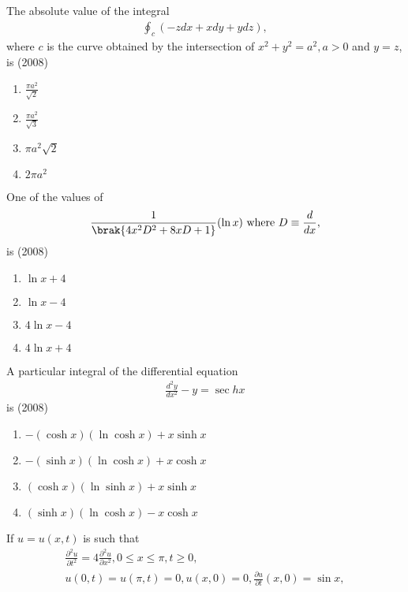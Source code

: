 	\item The absolute value of the integral
           \begin{align*}
		\oint_{c}(-zdx+xdy+ydz),
             \end{align*}
             where $c$ is the curve obtained by the intersection of $x^{2}+y^{2}=a^{2}, a>0$ and $y=z$, is
             \hfill{(2008)}
		\begin{enumerate}
			\item $\frac{\pi a^{2}}{\sqrt{2}}$
			\item $\frac{\pi a^{2}}{\sqrt{3}}$
			\item $\pi a^{2} \sqrt{2}$
			\item $2 \pi a^{2}$
        	\end{enumerate}	
	\item One of the values of
           \begin{align*}
		\frac{1}{\brak{4 x^{2} D^{2}+8 x D+1}}(\ln x) \text { where } D \equiv \frac{d}{d x},
             \end{align*} 
             is
             \hfill{(2008)}
		\begin{enumerate}
			\item $\ln x+4$
			\item $\ln x-4$
			\item $4 \ln x-4$
			\item $4 \ln x+4$
        	\end{enumerate}	
	\item A particular integral of the differential equation
             \begin{align*}
		\frac{d^{2} y}{d x^{2}}-y=\sec h x
             \end{align*}
	 is
	 \hfill{(2008)}
		\begin{enumerate}
			\item $-(\cosh x)(\ln \cosh x)+x \sinh x$
			\item $-(\sinh x)(\ln \cosh x)+x \cosh x$
			\item $(\cosh x)(\ln \sinh x)+x \sinh x$
			\item $(\sinh x)(\ln \cosh x)-x \cosh x$
        	\end{enumerate}
	\item If $u=u(x, t)$ is such that
                \begin{align*}
\frac{\partial^{2} u}{\partial t^{2}}=4 \frac{\partial^{2} u}{\partial x^{2}},
0 \leq x \leq \pi, t \geq 0,\\
u(0, t)=u(\pi, t)=0,
u(x, 0)=0,
\frac{\partial u}{\partial t}(x, 0)=\sin x,
                 \end{align*}
